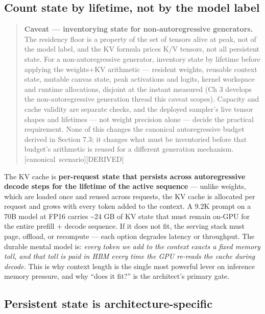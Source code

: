 \subsection{Count state by lifetime, not by the model
label}\label{count-state-by-lifetime-not-by-the-model-label}

\begin{quote}
\textbf{Caveat --- inventorying state for non-autoregressive
generators.} The residency floor is a property of the set of tensors
alive at peak, not of the model label, and the KV formula prices K/V
tensors, not all persistent state. For a non-autoregressive generator,
inventory state by lifetime before applying the weights+KV arithmetic
--- resident weights, reusable context state, mutable canvas state, peak
activations and logits, kernel workspace and runtime allocations,
disjoint at the instant measured (Ch 3 develops the non-autoregressive
generation thread this caveat scopes). Capacity and cache validity are
separate checks, and the deployed sampler's live tensor shapes and
lifetimes --- not weight precision alone --- decide the practical
requirement. None of this changes the canonical autoregressive budget
derived in Section 7.3; it changes what must be inventoried before that
budget's arithmetic is reused for a different generation mechanism.
\mbox{{[}canonical scenario{]}}\hspace{0pt}\mbox{{[}DERIVED{]}}
\end{quote}

\label{mental-model}


The KV cache is \textbf{per-request state that persists across
autoregressive decode steps for the lifetime of the active sequence} ---
unlike weights, which are loaded once and reused across requests, the KV
cache is allocated per request and grows with every token added to the
context. A 9.2K prompt on a 70B model at FP16 carries \textasciitilde24
GB of KV state that must remain on-GPU for the entire prefill + decode
sequence. If it does not fit, the serving stack must page, offload, or
recompute --- each option degrades latency or throughput. The durable
mental model is: \emph{every token we add to the context exacts a fixed
memory toll, and that toll is paid in HBM every time the GPU re-reads
the cache during decode.} This is why context length is the single most
powerful lever on inference memory pressure, and why ``does it fit?'' is
the architect's primary gate.

\subsection{Persistent state is
architecture-specific}\label{persistent-state-is-architecture-specific}


